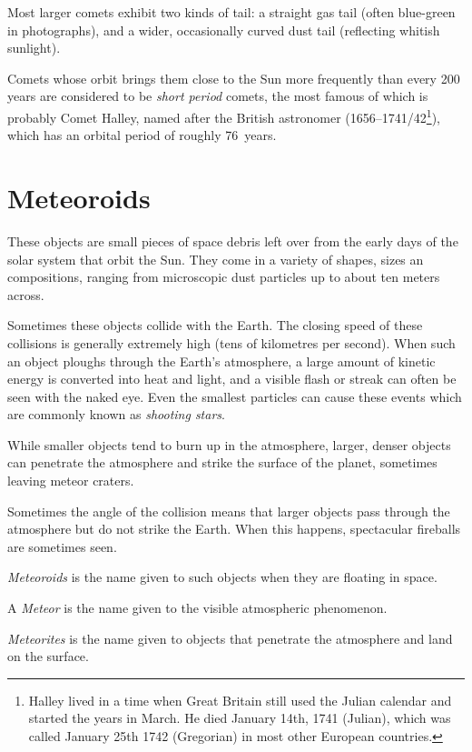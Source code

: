 Most larger comets exhibit two kinds of tail: a straight gas tail
(often blue-green in photographs), and a wider, occasionally curved
dust tail (reflecting whitish sunlight).

Comets whose orbit brings them close to the Sun more frequently than
every 200 years are considered to be \emph{short period} comets, the
most famous of which is probably Comet Halley, named after the British
astronomer  (1656--1741/42\footnote{Halley lived 
in a time when Great Britain still used the Julian calendar and started 
the years in March. He died January 14th, 1741 (Julian), 
which was called January 25th 1742 (Gregorian) in most other European countries.}), 
which has an orbital period of roughly 76~years.


\section{Meteoroids}
\label{sec:Phenomena:Meteoroids}

These objects are small pieces of space debris left over from the early
days of the solar system that orbit the Sun. They come in a variety of
shapes, sizes an compositions, ranging from microscopic dust particles
up to about ten meters across.

Sometimes these objects collide with the Earth. The closing speed of
these collisions is generally extremely high (tens of kilometres per
second). When such an object ploughs through the Earth's atmosphere, a
large amount of kinetic energy is converted into heat and light, and a
visible flash or streak can often be seen with the naked eye. Even the
smallest particles can cause these events which are commonly known as
\emph{shooting stars}.

While smaller objects tend to burn up in the atmosphere, larger, denser
objects can penetrate the atmosphere and strike the surface of the
planet, sometimes leaving meteor craters.

Sometimes the angle of the collision means that larger objects pass
through the atmosphere but do not strike the Earth. When this happens,
spectacular fireballs are sometimes seen.

\emph{Meteoroids} is the name given to such objects when they are
floating in space.

A \emph{Meteor} is the name given to the visible atmospheric phenomenon.

\emph{Meteorites} is the name given to objects that penetrate the
atmosphere and land on the surface.

